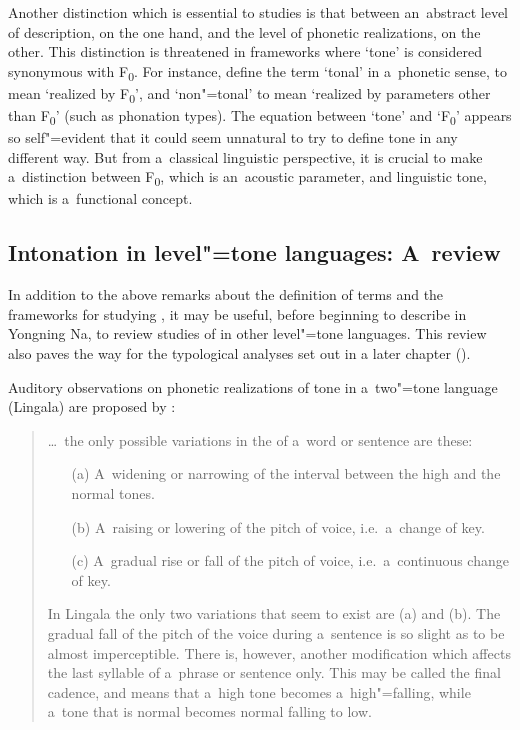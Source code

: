 Another distinction which is essential to  studies is that between an~abstract level of description, on the one hand, and the level of phonetic realizations, on the other. This distinction is threatened in frameworks where ‘tone’
  is considered synonymous with F\textsubscript{0}. For instance, \citet{hymanetal2008b} define the term ‘tonal’ in a~phonetic sense, to mean
  ‘realized by F\textsubscript{0}’, and ‘non"=tonal’ to mean ‘realized by parameters other than F\textsubscript{0}’ (such as
  phonation types). The equation between ‘tone’ and ‘F\textsubscript{0}’ appears so self"=evident that it could seem unnatural to try to define tone in any different
  way. But from a~classical linguistic perspective, it is crucial to make a~distinction between
  F\textsubscript{0}, which is an~acoustic parameter, and linguistic tone, which is a~functional concept.


\subsection{Intonation in level"=tone languages: A~review}
\label{sec:literaturereviewintonationintonallanguages}

In addition to the above remarks about the definition of terms and the frameworks for studying , it may be useful, before beginning to describe  in Yongning Na, to review studies of  in other level"=tone languages. This review also paves the way for the typological analyses set out in a later chapter ().

Auditory observations on phonetic realizations of tone in a~two"=tone language (Lingala) are proposed by \citet{guthrie1940}:

\begin{quotation}
	{\dots}~the only possible variations in the  of a~word or sentence are these: 
	\begin{enumerate}[itemsep=0pt, topsep=0pt, partopsep=0pt, parsep=0pt]
	\item[(a)] A~widening or narrowing of the interval between the high and the normal tones.
	\item[(b)] A~raising or lowering of the pitch of voice, i.e.\ a~change of key.
	\item[(c)] A~gradual rise or fall of the pitch of voice, i.e.\ a~continuous change of key.
	\end{enumerate}
	In Lingala the only two variations that seem to exist are (a) and (b). The gradual fall of the pitch of the voice during a~sentence is so slight as to be almost imperceptible. There is, however, another modification which affects the last syllable of a~phrase or sentence only. This may be called the final cadence, and means that a~high tone becomes a~high"=falling, while a~tone that is normal becomes normal falling to low. \citep[472--473]{guthrie1940}
\end{quotation}

